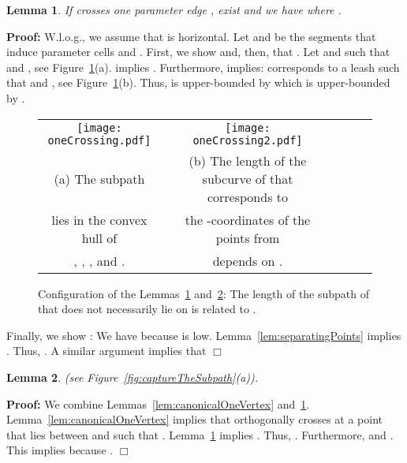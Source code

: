 \documentclass[a4paper,11pt]{article}
\newtheorem{lemma}{Lemma}
\newenvironment{proof}{\textbf{Proof:}}{\hspace*{0mm}\hfill\ensuremath{\Box}}
\begin{document}
\begin{lemma}\label{lem:oneCrossing}
	If  crosses one parameter edge ,  exist and we have  where .
\end{lemma}
\begin{proof} W.l.o.g., we assume that  is horizontal. Let  and  be the segments that induce  parameter cells  and . First, we show  and, then, that . Let  and  such that  and , see Figure~\ref{fig:oneCrossing}(a).  implies . Furthermore,  implies:  corresponds to a leash  such that  and , see Figure~\ref{fig:oneCrossing}(b). Thus,  is upper-bounded by  which is upper-bounded by .




\begin{figure}[ht]
  \begin{center}
    \begin{tabular}{ccccccc}
      \texttt{[image: oneCrossing.pdf]} & &
       \texttt{[image: oneCrossing2.pdf]}&&\\ 
{\small (a) The subpath } & &
      {\small (b) The length of the subcurve of  that corresponds to}&&\\
      {\small lies in the convex hull of}& &
      {\small the -coordinates of the points from }&&\\
      {\small , , , and .}&&
      {\small depends on .}&&
    \end{tabular}
  \end{center}
  \vspace*{-12pt}
  \caption{Configuration of the Lemmas~\ref{lem:oneCrossing} and~\ref{lem:shortestPathOneCrossing}: The length of the subpath of  that does not necessarily lie on  is related to .}
  \label{fig:oneCrossing}
\end{figure}

	Finally, we show : We have  because  is low. Lemma~\ref{lem:separatingPoints} implies . Thus, . A similar argument implies that 
\end{proof}
	
\begin{lemma}\label{lem:shortestPathOneCrossing}
	 (see Figure~\ref{fig:captureTheSubpath}(a)).
\end{lemma} 
\begin{proof}
	We combine Lemmas~\ref{lem:canonicalOneVertex} and~\ref{lem:oneCrossing}. Lemma~\ref{lem:canonicalOneVertex} implies that  orthogonally crosses    at a point  that lies between  and  such that . Lemma~\ref{lem:oneCrossing} implies . Thus, . Furthermore,  and . This implies  because .
\end{proof}
\end{document}

